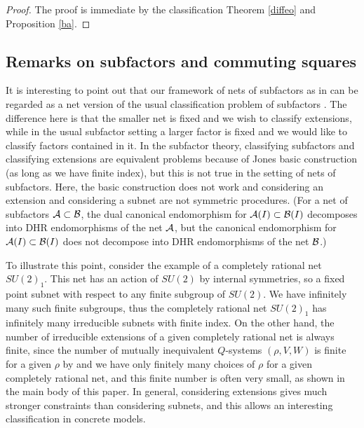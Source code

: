 \documentclass[12pt]{article}
\def\N{{\cal A}}
\def\M{{\cal B}}
\begin{document}
\begin{proof} The proof is immediate by the classification Theorem 
\ref{diffeo} and Proposition \ref{ba}.
\end{proof}

\subsection{Remarks on subfactors and commuting squares}
\label{rema}

It is interesting to point out that our 
framework of nets of subfactors as in \cite{LR}
can be regarded as a net version of the usual classification
problem of subfactors \cite{J}. The difference here is that the
smaller net is fixed and we wish to classify extensions, while in
the usual subfactor setting a larger factor is fixed and we would
like to classify factors contained in it.  In the subfactor theory,
classifying subfactors and classifying extensions are equivalent 
problems because of Jones basic construction \cite{J} 
(as long as we have finite index),
but this is not true in the setting of nets of subfactors.  Here, 
the basic construction does not work and considering
an extension and considering a subnet are not symmetric procedures.
(For a net of subfactors
$\N\subset \M$, the dual canonical endomorphism for
$\N(I)\subset \M(I)$ decomposes into DHR endomorphisms of the net
$\N$, but the canonical endomorphism for $\N(I)\subset \M(I)$
does not decompose into  DHR endomorphisms of the net $\M$.)

To illustrate this point, consider the example of a completely
rational net $SU(2)_1$.  This net has an action of
$SU(2)$ by internal symmetries, so a fixed point subnet with respect to
any finite subgroup of $SU(2)$. We have infinitely many
such finite subgroups,  thus the completely rational
net $SU(2)_1$ has infinitely many irreducible subnets with finite index.
On the other hand, the number of irreducible
extensions of a given completely rational
net is always finite, since the number of mutually 
inequivalent $Q$-systems $(\rho, V, W)$ is finite for a given 
$\rho$ by \cite{IK} and
we have only finitely many choices of $\rho$ for a given
completely rational net,
and this finite number is often very small, as shown in the main body
of this paper.  In general, considering
extensions gives much stronger constraints than considering subnets,
and this allows an interesting classification in concrete models.
\end{document}
